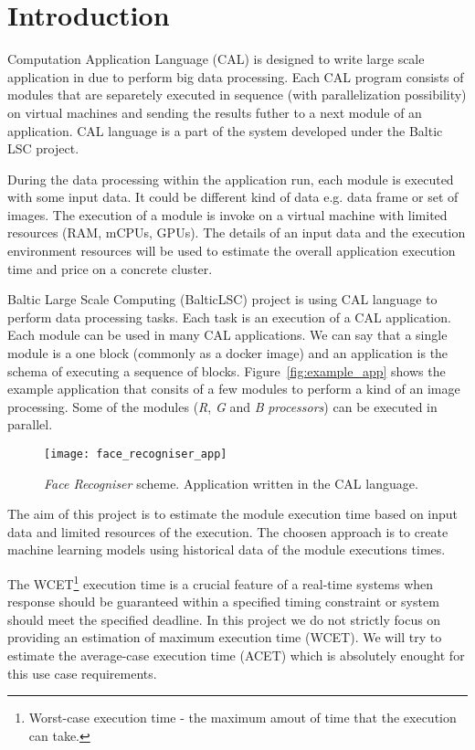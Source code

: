 \section{Introduction}

Computation Application Language (CAL) is designed to write large scale application in due to perform big data processing. Each CAL program consists of modules that are separetely executed in sequence (with parallelization possibility) on virtual machines and sending the results futher to a next module of an application. CAL language is a part of the system developed under the Baltic LSC\cite{baltic_lsc_website} project.

During the data processing within the application run, each module is executed with some input data. It could be different kind of data e.g. data frame or set of images. The execution of a module is invoke on a virtual machine with limited resources (RAM, mCPUs, GPUs). The details of an input data and the execution environment resources will be used to estimate the overall application execution time and price on a concrete cluster.

Baltic Large Scale Computing (BalticLSC\cite{baltic_lsc}) project is using CAL language to perform data processing tasks. Each task is an execution of a CAL application. Each module can be used in many CAL applications. We can say that a single module is a one block (commonly as a docker image) and an application is the schema of executing a sequence of blocks. Figure~\ref{fig:example_app} shows the example application that consits of a few modules to perform a kind of an image processing. Some of the modules (\textit{R}, \textit{G} and \textit{B} \textit{processors}) can be executed in parallel.

\begin{figure*}[!t]
	\centering
	\begin{minipage}{0.9\linewidth}
	\texttt{[image: face\_recogniser\_app]}
	\end{minipage}
	\caption{\textit{Face Recogniser} scheme. Application written in the CAL language.}
	\label{fig:face_recogniser_app}
\end{figure*}

The aim of this project is to estimate the module execution time based on input data and limited resources of the execution. The choosen approach is to create machine learning models using historical data of the module executions times.

The WCET\footnote{Worst-case execution time - the maximum amout of time that the execution can take.} execution time is a crucial feature of a real-time systems\cite{wcet} when response should be guaranteed within a specified timing constraint or system should meet the specified deadline. In this project we do not strictly focus on providing an estimation of maximum execution time (WCET). We will try to estimate the average-case execution time (ACET) which is absolutely enought for this use case requirements.